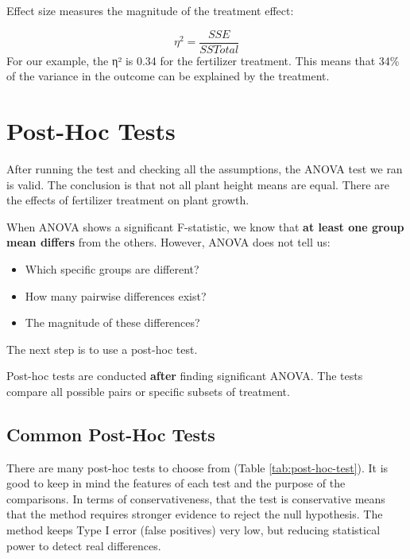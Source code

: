 \documentclass[
]{book}
\providecommand{\tightlist}{%
  \setlength{\itemsep}{0pt}\setlength{\parskip}{0pt}}
\begin{document}
Effect size measures the magnitude of the treatment effect:

\[\eta^2 = \frac{SSE}{SSTotal}\]
For our example, the η² is 0.34 for the fertilizer treatment. This means that 34\% of the variance in the outcome can be explained by the treatment.

\section{Post-Hoc Tests}\label{post-hoc-tests}

After running the test and checking all the assumptions, the ANOVA test we ran is valid. The conclusion is that not all plant height means are equal. There are the effects of fertilizer treatment on plant growth.

When ANOVA shows a significant F-statistic, we know that \textbf{at least one group mean differs} from the others. However, ANOVA does not tell us:

\begin{itemize}
\tightlist
\item
  Which specific groups are different?
\item
  How many pairwise differences exist?
\item
  The magnitude of these differences?
\end{itemize}

The next step is to use a post-hoc test.

Post-hoc tests are conducted \textbf{after} finding significant ANOVA. The tests compare all possible pairs or specific subsets of treatment.

\subsection{Common Post-Hoc Tests}\label{common-post-hoc-tests}

There are many post-hoc tests to choose from (Table \ref{tab:post-hoc-test}). It is good to keep in mind the features of each test and the purpose of the comparisons. In terms of conservativeness, that the test is conservative means that the method requires stronger evidence to reject the null hypothesis. The method keeps Type I error (false positives) very low, but reducing statistical power to detect real differences.
\end{document}
